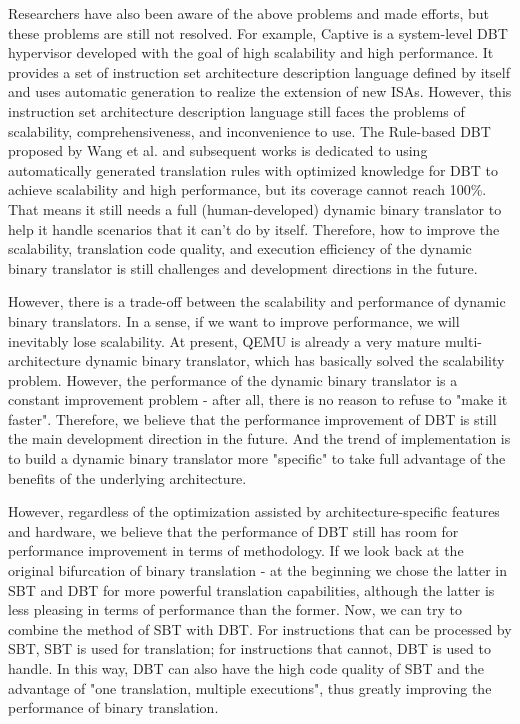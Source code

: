 Researchers have also been aware of the above problems and made efforts, but these problems are still not resolved.
For example, Captive is a system-level DBT hypervisor developed with the goal of high scalability and high performance.
It provides a set of instruction set architecture description language defined by itself and uses automatic generation to realize the extension of new ISAs.
However, this instruction set architecture description language still faces the problems of scalability, comprehensiveness, and inconvenience to use.
The Rule-based DBT proposed by Wang et al. and subsequent works is dedicated to using automatically generated translation rules with optimized knowledge for DBT to achieve scalability and high performance, but its coverage cannot reach 100\%.
That means it still needs a full (human-developed) dynamic binary translator to help it handle scenarios that it can't do by itself.
Therefore, how to improve the scalability, translation code quality, and execution efficiency of the dynamic binary translator is still challenges and development directions in the future.

However, there is a trade-off between the scalability and performance of dynamic binary translators.
In a sense, if we want to improve performance, we will inevitably lose scalability.
At present, QEMU is already a very mature multi-architecture dynamic binary translator, which has basically solved the scalability problem.
However, the performance of the dynamic binary translator is a constant improvement problem - after all, there is no reason to refuse to "make it faster".
Therefore, we believe that the performance improvement of DBT is still the main development direction in the future.
And the trend of implementation is to build a dynamic binary translator more "specific" to take full advantage of the benefits of the underlying architecture.

However, regardless of the optimization assisted by architecture-specific features and hardware, we believe that the performance of DBT still has room for performance improvement in terms of methodology.
If we look back at the original bifurcation of binary translation - at the beginning we chose the latter in SBT and DBT for more powerful translation capabilities, although the latter is less pleasing in terms of performance than the former.
Now, we can try to combine the method of SBT with DBT.
For instructions that can be processed by SBT, SBT is used for translation; for instructions that cannot, DBT is used to handle.
In this way, DBT can also have the high code quality of SBT and the advantage of "one translation, multiple executions", thus greatly improving the performance of binary translation.
